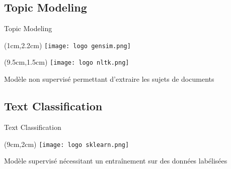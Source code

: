 \documentclass[10pt,sans,usenames,dvipsnames,english,compress]{beamer}
\begin{document}
\subsection{Topic Modeling}
\begin{frame}{Topic Modeling}
	\begin{textblock*}{3cm}(1cm,2.2cm)
		\texttt{[image: logo gensim.png]}
	\end{textblock*}

	\begin{textblock*}{3cm}(9.5cm,1.5cm)
		\texttt{[image: logo nltk.png]}
	\end{textblock*}

	\vspace{1cm}

	\begin{block}{}
		Modèle non supervisé permettant d'extraire les sujets de documents
	\end{block}

        \vspace{0.5cm}

\end{frame}

\subsection{Text Classification}
\begin{frame}{Text Classification}
	\begin{textblock*}{3cm}(9cm,2cm)
		\texttt{[image: logo sklearn.png]}
	\end{textblock*}

	\vspace{1cm}

	\begin{block}{}
		Modèle supervisé nécessitant un entraînement sur des données labélisées
	\end{block}

        \vspace{0.5cm}

\end{frame}
\end{document}

